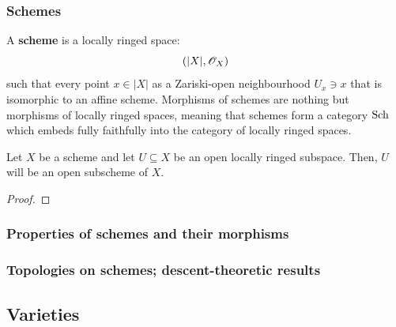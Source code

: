         \subsubsection{Schemes}
            \begin{definition}[Schemes] \label{def: schemes}
                A \textbf{scheme} is a locally ringed space:
                    $$(|X|, \mathscr{O}_X)$$
                such that every point $x \in |X|$ as a Zariski-open neighbourhood $U_x \ni x$ that is isomorphic to an affine scheme. Morphisms of schemes are nothing but morphisms of locally ringed spaces, meaning that schemes form a category $\mathrm{Sch}$ which embeds fully faithfully into the category of locally ringed spaces.
            \end{definition}
            
            \begin{proposition} \label{prop: open_subschemes_are_open_locally_ringed_subspaces}
                Let $X$ be a scheme and let $U \subseteq X$ be an open locally ringed subspace. Then, $U$ will be an open subscheme of $X$. 
            \end{proposition}
                \begin{proof}
                    
                \end{proof}
            \begin{corollary} \label{coro: zariski_bases_of_schemes}
                
            \end{corollary}
    
        \subsubsection{Properties of schemes and their morphisms}
        
        \subsubsection{Topologies on schemes; descent-theoretic results}
    
    \subsection{Varieties}